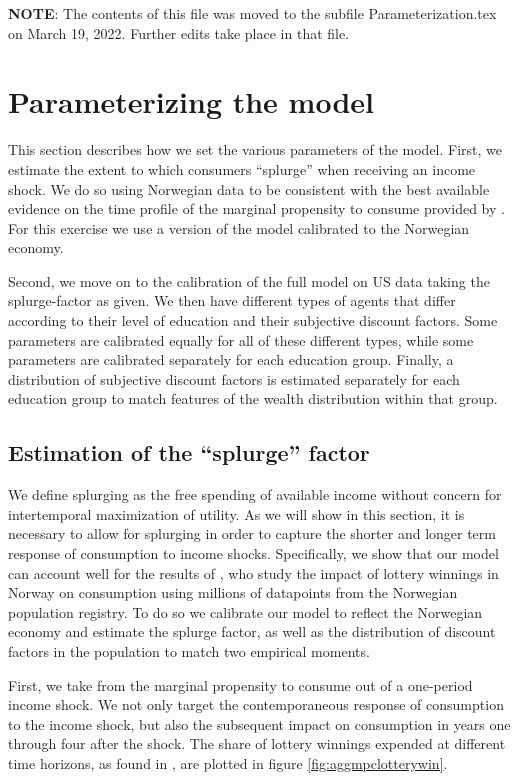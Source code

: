 \documentclass[11pt]{article}
\begin{document}
	
\textbf{NOTE}: The contents of this file was moved to the subfile Parameterization.tex on March 19, 2022. Further edits take place in that file. 

\section{Parameterizing the model}

This section describes how we set the various parameters of the model. First, we estimate the extent to which consumers ``splurge'' when receiving an income shock. We do so using Norwegian data to be consistent with the best available evidence on the time profile of the marginal propensity to consume provided by \citet{fagereng_mpc_2021}. For this exercise we use a version of the model calibrated to the Norwegian economy. 

Second, we move on to the calibration of the full model on US data taking the splurge-factor as given. We then have different types of agents that differ according to their level of education and their subjective discount factors. Some parameters are calibrated equally for all of these different types, while some parameters are calibrated separately for each education group. Finally, a distribution of subjective discount factors is estimated separately for each education group to match features of the wealth distribution within that group. 

\subsection{Estimation of the ``splurge'' factor}
\label{sec:splurge}

We define splurging as the free spending of available income without concern for intertemporal maximization of utility. As we will show in this section, it is necessary to allow for splurging in order to capture the shorter and longer term response of consumption to income shocks. Specifically, we show that our model can account well for the results of \citet{fagereng_mpc_2021}, who study the impact of lottery winnings in Norway on consumption using millions of datapoints from the Norwegian population registry. To do so we calibrate our model to reflect the Norwegian economy and estimate the splurge factor, as well as the distribution of discount factors in the population to match two empirical moments. 

First, we take from \citet{fagereng_mpc_2021} the marginal propensity to consume out of a one-period income shock. We not only target the contemporaneous response of consumption to the income shock, but also the subsequent impact on consumption in years one through four after the shock. The share of lottery winnings expended at different time horizons, as found in \citet{fagereng_mpc_2021}, are plotted in figure \ref{fig:aggmpclotterywin}.
	
\end{document}
